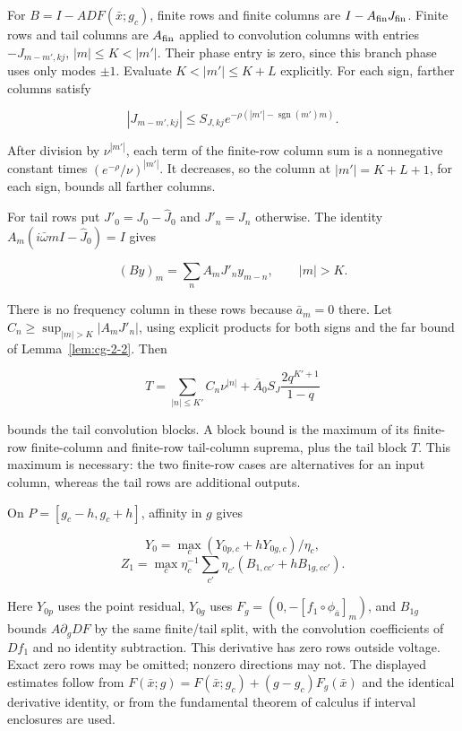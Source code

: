 \documentclass[11pt]{article}
\theoremstyle{definition}
\begin{document}
For $B=I-A DF(\bar x;g_c)$, finite rows and finite columns are $I-A_{\rm fin}J_{\rm fin}$. Finite rows and tail columns are $A_{\rm fin}$ applied to convolution columns with entries $-J_{m-m',kj}$, $|m|\le K<|m'|$. Their phase entry is zero, since this branch phase uses only modes $\pm1$. Evaluate $K<|m'|\le K+L$ explicitly. For each sign, farther columns satisfy

\[
 |J_{m-m',kj}|\le S_{J,kj}e^{-\rho(|m'|-\operatorname{sgn}(m')m)}.
\]

After division by $\nu^{|m'|}$, each term of the finite-row column sum is a nonnegative constant times $(e^{-\rho}/\nu)^{|m'|}$. It decreases, so the column at $|m'|=K+L+1$, for each sign, bounds all farther columns.

For tail rows put $J'_0=J_0-\widehat J_0$ and $J'_n=J_n$ otherwise. The identity $A_m(i\bar\omega mI-\widehat J_0)=I$ gives

\[
 (By)_m=\sum_n A_mJ'_n y_{m-n},\qquad |m|>K.
\]

There is no frequency column in these rows because $\bar a_m=0$ there. Let $C_n\ge\sup_{|m|>K}|A_mJ'_n|$, using explicit products for both signs and the far bound of Lemma~\ref{lem:cg-2-2}. Then

\[
 T=\sum_{|n|\le K'}C_n\nu^{|n|}
   +\overline A_0 S_J\frac{2q^{K'+1}}{1-q}
\]

bounds the tail convolution blocks. A block bound is the maximum of its finite-row finite-column and finite-row tail-column suprema, plus the tail block $T$. This maximum is necessary: the two finite-row cases are alternatives for an input column, whereas the tail rows are additional outputs.

On $P=[g_c-h,g_c+h]$, affinity in $g$ gives

\[
 Y_0=\max_c(Y_{0p,c}+hY_{0g,c})/\eta_c,
\]
\[
 Z_1=\max_c\eta_c^{-1}\sum_{c'}\eta_{c'}(B_{1,cc'}+hB_{1g,cc'}).
\]

Here $Y_{0p}$ uses the point residual, $Y_{0g}$ uses $F_g=(0,-[f_1\circ\phi_{\bar a}]_m)$, and $B_{1g}$ bounds $A\partial_g DF$ by the same finite/tail split, with the convolution coefficients of $D f_1$ and no identity subtraction. This derivative has zero rows outside voltage. Exact zero rows may be omitted; nonzero directions may not. The displayed estimates follow from $F(\bar x;g)=F(\bar x;g_c)+(g-g_c)F_g(\bar x)$ and the identical derivative identity, or from the fundamental theorem of calculus if interval enclosures are used.
\end{document}
